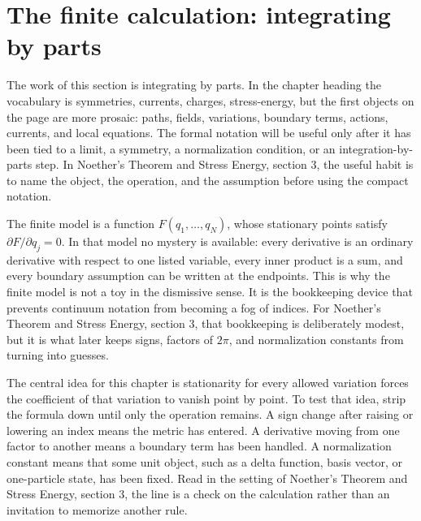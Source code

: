 \section{The finite calculation: integrating by parts}













The work of this section is integrating by parts.  In the chapter heading the vocabulary is symmetries, currents, charges, stress-energy, but the first objects on the page are more prosaic: paths, fields, variations, boundary terms, actions, currents, and local equations.  The formal notation will be useful only after it has been tied to a limit, a symmetry, a normalization condition, or an integration-by-parts step.  In Noether's Theorem and Stress Energy, section 3, the useful habit is to name the object, the operation, and the assumption before using the compact notation.

The finite model is a function \(F(q_1,\ldots,q_N)\), whose stationary points satisfy \( \partial F/\partial q_j=0 \).  In that model no mystery is available: every derivative is an ordinary derivative with respect to one listed variable, every inner product is a sum, and every boundary assumption can be written at the endpoints.  This is why the finite model is not a toy in the dismissive sense.  It is the bookkeeping device that prevents continuum notation from becoming a fog of indices.  For Noether's Theorem and Stress Energy, section 3, that bookkeeping is deliberately modest, but it is what later keeps signs, factors of \(2\pi\), and normalization constants from turning into guesses.

The central idea for this chapter is stationarity for every allowed variation forces the coefficient of that variation to vanish point by point.  To test that idea, strip the formula down until only the operation remains.  A sign change after raising or lowering an index means the metric has entered.  A derivative moving from one factor to another means a boundary term has been handled.  A normalization constant means that some unit object, such as a delta function, basis vector, or one-particle state, has been fixed.  Read in the setting of Noether's Theorem and Stress Energy, section 3, the line is a check on the calculation rather than an invitation to memorize another rule.

